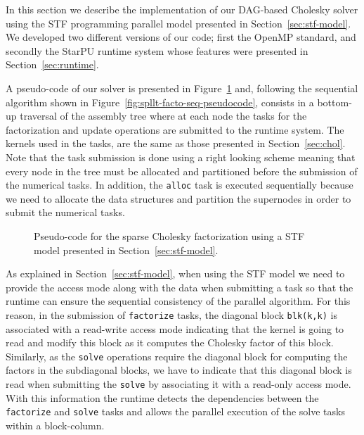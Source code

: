 \documentclass{article}
\begin{document}

In this section we describe the implementation of our DAG-based
Cholesky solver using the STF programming parallel model presented in
Section~\ref{sec:stf-model}. We developed two different versions of our
code; first the OpenMP standard, and secondly the StarPU runtime
system whose features were presented in Section~\ref{sec:runtime}.

A pseudo-code of our solver is presented in
Figure~\ref{fig:spllt-facto-pseudocode} and, following the sequential
algorithm shown in Figure~\ref{fig:spllt-facto-seq-pseudocode},
consists in a bottom-up traversal of the assembly tree where at each
node the tasks for the factorization and update operations are
submitted to the runtime system. The kernels used in the tasks, are
the same as those presented in Section~\ref{sec:chol}. Note that
the task submission is done using a right looking scheme meaning
that every node in the tree must be allocated and partitioned before
the submission of the numerical tasks. In addition, the \texttt{alloc}
task is executed sequentially because we need to allocate the data
structures and partition the supernodes in order to submit the
numerical tasks.

\begin{figure}[!h]
  \centering 
  \caption{\label{fig:spllt-facto-pseudocode}Pseudo-code for the sparse
    Cholesky factorization using a STF model presented in
    Section~\ref{sec:stf-model}.}
\end{figure}

As explained in Section~\ref{sec:stf-model}, when using the STF model
we need to provide the access mode along with the data when submitting
a task so that the runtime can ensure the sequential consistency of
the parallel algorithm. For this reason, in the submission of
\texttt{factorize} tasks, the diagonal block \texttt{blk(k,k)} is
associated with a read-write access mode indicating that the kernel is
going to read and modify this block as it computes the Cholesky factor
of this block. Similarly, as the \texttt{solve} operations require the
diagonal block for computing the factors in the subdiagonal blocks, we
have to indicate that this diagonal block is read when submitting the
\texttt{solve} by associating it with a read-only access mode. With
this information the runtime detects the dependencies between the
\texttt{factorize} and \texttt{solve} tasks and allows the parallel
execution of the solve tasks within a block-column.
\end{document}

